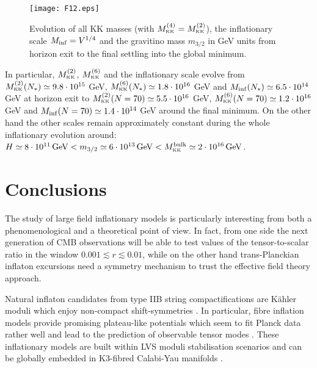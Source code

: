 \documentclass[11pt,a4paper]{article}
\def\KK{{\scriptscriptstyle \rm KK}}
\begin{document}
\begin{figure}[h!]
\begin{center}
\texttt{[image: F12.eps]}
\caption{Evolution of all KK masses (with $M_\KK^{(4)}=M_\KK^{(2)}$), the inflationary scale $M_{\rm inf} = V^{1/4}$ and the gravitino mass $m_{3/2}$ in GeV units from horizon exit to the final settling into the global minimum.}
\label{FigKK2}
\end{center}
\end{figure}

In particular, $M_\KK^{(2)}$, $M_\KK^{(6)}$ and the inflationary scale evolve from $M_\KK^{(2)}(N_*)\simeq 9.8\cdot 10^{15}$ GeV, $M_\KK^{(6)}(N_*)\simeq 1.8\cdot 10^{16}$ GeV and $M_{\rm inf}(N_*)\simeq 6.5\cdot 10^{14}$ GeV at horizon exit to $M_\KK^{(2)}(N=70)\simeq 5.5\cdot 10^{16}$ GeV, $M_\KK^{(6)}(N=70)\simeq 1.2\cdot 10^{16}$ GeV and $M_{\rm inf}(N=70)\simeq 1.4\cdot 10^{14}$ GeV around the final minimum. On the other hand the other scales remain approximately constant during the whole inflationary evolution around: $H\simeq 8\cdot 10^{11}\,{\rm GeV} < m_{3/2}\simeq 6\cdot 10^{13}\,{\rm GeV} < M_\KK^{\rm bulk}\simeq 2\cdot 10^{16}\,{\rm GeV}$.



\section{Conclusions}
\label{Concl}

The study of large field inflationary models is particularly interesting from both a phenomenological and a theoretical point of view. In fact, from one side the next generation of CMB observations will be able to test values of the tensor-to-scalar ratio in the window $0.001\lesssim r\lesssim 0.01$, while on the other hand trans-Planckian inflaton excursions need a symmetry mechanism to trust the effective field theory approach. 

Natural inflaton candidates from type IIB string compactifications are K\"ahler moduli which enjoy non-compact shift-symmetries \cite{Burgess:2014tja}. In particular, fibre inflation models provide promising plateau-like potentials which seem to fit Planck data rather well and lead to the prediction of observable tensor modes \cite{Cicoli:2008gp, Broy:2015zba, Cicoli:2016chb, Burgess:2016owb}. These inflationary models are built within LVS moduli stabilisation scenarios and can be globally embedded in K3-fibred Calabi-Yau manifolds \cite{Cicoli:2016xae}. 
\end{document}
